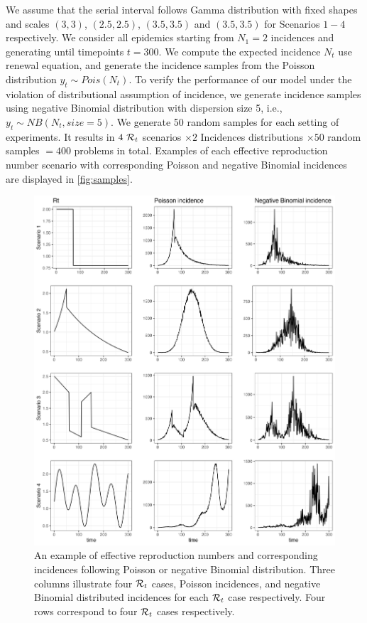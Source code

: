 We assume that the serial interval follows Gamma distribution with fixed shapes and scales $(3,3)$, $(2.5,2.5)$, $(3.5,3.5)$ and $(3.5,3.5)$ for Scenarios $1-4$ respectively. We consider all epidemics starting from $N_1=2$ incidences and generating until timepoints $t=300$. We compute the expected incidence $N_t$ use renewal equation, and generate the incidence samples from the Poisson distribution $y_t\sim Pois(N_t)$. 
To verify the performance of our model under the violation of distributional assumption of incidence, we generate incidence samples using negative Binomial distribution with dispersion size 5, i.e., $y_t\sim NB(N_t, {size=}5)$. We generate 50 random samples for each setting of experiments. It results in $4\ \mathcal{R}_t$ scenarios $\times 2$ Incidences distributions $\times 50$ random samples $= 400$ problems in total. 
Examples of each effective reproduction number scenario with corresponding Poisson and negative Binomial incidences are displayed in \autoref{fig:samples}. 
\begin{figure}[tb]
    \centering
    \includegraphics[width=140mm]{fig/plot_samples.png}
    \caption{An example of effective reproduction numbers and corresponding incidences following Poisson or negative Binomial distribution. Three columns illustrate four $\mathcal{R}_t$ cases, Poisson incidences, and negative Binomial distributed incidences for each $\mathcal{R}_t$ case respectively. Four rows correspond to four $\mathcal{R}_t$ cases respectively.} 
    \label{fig:samples}
\end{figure}

